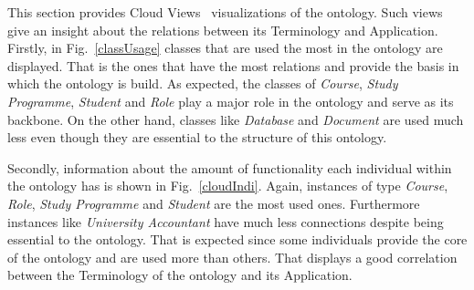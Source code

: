 \documentclass{article}    %
\begin{document}
This section provides Cloud Views~\cite{clo} visualizations of the ontology. Such views give an insight about the relations between its Terminology and Application. Firstly, in Fig.~\ref{classUsage} classes that are used the most in the ontology are displayed. That is the ones that have the most relations and provide the basis in which the ontology is build. As expected, the classes of \textit{Course}, \textit{Study Programme}, \textit{Student} and \textit{Role} play a major role in the ontology and serve as its backbone. On the other hand, classes like \textit{Database} and \textit{Document} are used much less even though they are essential to the structure of this ontology.

Secondly, information about the amount of functionality each individual within the ontology has is shown in Fig.~\ref{cloudIndi}. Again, instances of type \textit{Course}, \textit{Role}, \textit{Study Programme} and \textit{Student} are the most used ones. Furthermore instances like \textit{University Accountant} have much less connections despite being essential to the ontology. That is expected since some individuals provide the core of the ontology and are used more than others. That displays a good correlation between the Terminology of the ontology and its Application.
% 
\end{document}
